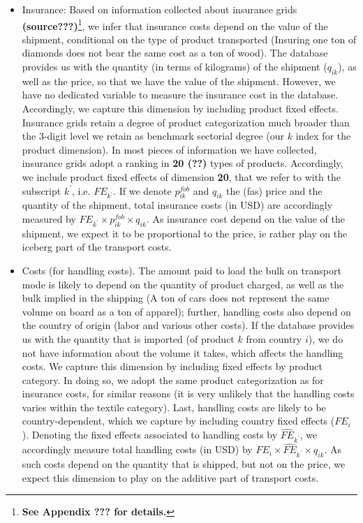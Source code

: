 \documentclass[a4paper,11pt]{article}
\begin{document}
\begin{itemize}
\item Insurance: Based on information collected about insurance grids \textbf{(source???)}\footnote{\textbf{See Appendix ??? for details.}}, we infer that insurance costs depend on the value of the shipment, conditional on the type of product transported (Insuring one ton of diamonds does not bear the same cost as a ton of wood). The database provides us with the quantity (in terms of kilograms) of the shipment ($q_{ik}$), as well as the price, so that we have the value of the shipment. However, we have no dedicated variable to measure the insurance cost in the database. Accordingly, we capture this dimension by including product fixed effects. Insurance grids retain a degree of product categorization much broader than the 3-digit level we retain as benchmark sectorial degree (our $k$ index for the product dimension). In most pieces of information we have collected, insurance grids adopt a ranking in \textbf{20 (??)} types of products. Accordingly, we include product fixed effects of dimension \textbf{20}, that we refer to with the subscript $k^\prime$, i.e. $FE_{k^\prime}$. If we denote $p_{ik}^{fob}$ and $q_{ik}$ the (fas) price and the quantity of the shipment, total insurance costs (in USD) are accordingly measured by $FE_{k^\prime}\times p_{ik}^{fob}\times q_{ik}$. As insurance cost depend on the value of the shipment, we expect it to be proportional to the price, ie rather play on the iceberg part of the transport costs.

\item Costs (for handling costs). The amount paid to load the bulk on transport mode is likely to depend on the quantity of product charged, as well as the bulk implied in the shipping (A ton of cars does not represent the same volume on board as a ton of apparel); further, handling costs also depend on the country of origin (labor and various other costs). If the database provides us with the quantity that is imported (of product $k$ from country $i$), we do not have information about the volume it takes, which affects the handling costs. We capture this dimension by including fixed effects by product category. In doing so, we adopt the same product categorization as for insurance costs, for similar reasons (it is very unlikely that the handling costs varies within the textile category). Last, handling costs are likely to be country-dependent, which we capture by including country fixed effects ($FE_i$). Denoting the fixed effects associated to handling costs by $\widehat{FE}_{k^\prime}$, we accordingly measure total handling costs (in USD) by $FE_i\times\widehat{FE}_{k^\prime}\times q_{ik}$. As such costs depend on the quantity that is shipped, but not on the price, we expect this dimension to play on the additive part of transport costs.


\end{itemize}
\end{document}
